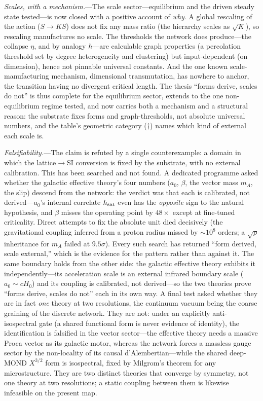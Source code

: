 \documentclass[aps,prl,reprint,nofootinbib,superscriptaddress,floatfix]{revtex4-2}
\begin{document}
\emph{Scales, with a mechanism.}---The scale sector---equilibrium and the driven
steady state tested---is now closed with a positive account of \emph{why}. A global rescaling of the action ($S\to KS$) does not fix
any mass ratio (the hierarchy scales as $\sqrt{K}$), so rescaling manufactures no scale. The
thresholds the network does produce---the collapse $\eta$, and by analogy $\hbar$---are
calculable graph properties (a percolation threshold set by degree heterogeneity and
clustering) but input-dependent (on dimension), hence not pinnable universal constants. And
the one known scale-manufacturing mechanism, dimensional transmutation, has nowhere to
anchor, the transition having no divergent critical length. The thesis ``forms derive,
scales do not'' is thus complete for the equilibrium sector, extends to the one
non-equilibrium regime tested, and now carries both a mechanism and a structural reason: the
substrate fixes forms and graph-thresholds, not absolute universal numbers, and the
table's geometric category ($\dagger$) names which kind of external each scale is.

\emph{Falsifiability.}---The claim is refuted by a single counterexample: a domain in which
the lattice$\to$SI conversion is fixed by the substrate, with no external calibration. This
has been searched and not found. A dedicated programme asked whether the galactic effective
theory's four numbers ($a_0$, $\beta$, the vector mass $m_A$, the slip) descend from the
network: the verdict was that each is calibrated, not derived---$a_0$'s internal correlate
$h_{\rm sat}$ even has the \emph{opposite} sign to the natural hypothesis, and $\beta$
misses the operating point by $48\times$ except at fine-tuned criticality. Direct attempts
to fix the absolute unit died decisively (the gravitational coupling inferred from a proton
radius missed by $\sim10^{8}$ orders; a $\sqrt{\rho}$ inheritance for $m_A$ failed at
$9.5\sigma$). Every such search has returned ``form derived, scale external,'' which is the
evidence for the pattern rather than against it. The same boundary holds from the other
side: the galactic effective theory exhibits it independently---its acceleration scale is an
external infrared boundary scale ($a_0\sim cH_0$) and its coupling is calibrated, not
derived---so the two theories prove ``forms derive, scales do not'' each in its own way. A
final test asked whether they are in fact \emph{one} theory at two resolutions, the
continuum vacuum being the coarse graining of the discrete network. They are not: under an
explicitly anti-isospectral gate (a shared functional form is never evidence of identity),
the identification is falsified in the vector sector---the effective theory needs a massive
Proca vector as its galactic motor, whereas the network forces a massless gauge sector by
the non-locality of its causal d'Alembertian---while the shared deep-MOND $X^{3/2}$ form is
isospectral, fixed by Milgrom's theorem for any microstructure. They are two distinct
theories that converge by symmetry, not one theory at two resolutions; a static coupling
between them is likewise infeasible on the present map.
\end{document}
